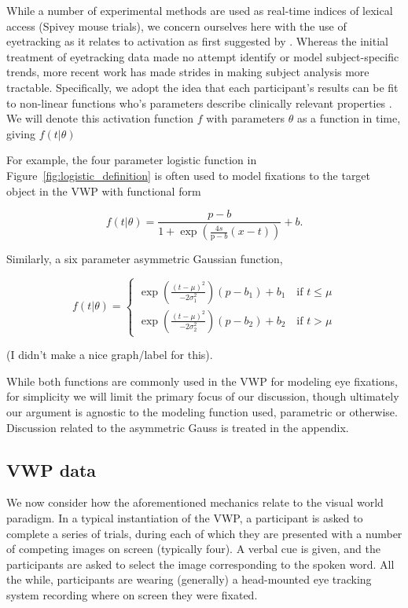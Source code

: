 While a number of experimental methods are used as real-time indices of lexical access (Spivey mouse trials), we concern ourselves here with the use of eyetracking as it relates to activation as first suggested by \cite{allopenna1998tracking}. Whereas the initial treatment of eyetracking data made no attempt identify or model subject-specific trends, more recent work has made strides in making subject analysis more tractable. Specifically, we adopt the idea that each participant's results can be fit to non-linear functions who's parameters describe clinically relevant properties \cite{mcmurray2010individual}. We will denote this activation function $f$ with parameters $\theta$ as a function in time, giving $f(t|\theta)$

For example, the four parameter logistic function in Figure~\ref{fig:logistic_definition} is often used to model fixations to the target object in the VWP with functional form

\begin{equation} \label{eq:logistic}
f(t|\theta) = \frac{p-b}{1 + \exp \left(\frac{4s}{\text{p}-b} (x - t) \right)} + b.
\end{equation}

Similarly, a six parameter asymmetric Gaussian function,

\begin{equation} \label{eq:dg}
f(t|\theta) = \begin{cases}
\exp \left( \frac{(t - \mu)^2}{-2\sigma_1^2} \right) (p - b_1) + b_1 \quad \text{if } t \leq \mu \\
\exp \left( \frac{(t - \mu)^2}{-2\sigma_2^2} \right) (p - b_2) + b_2 \quad \text{if } t > \mu
\end{cases}
\end{equation}

(I didn't make a nice graph/label for this). 

While both functions are commonly used in the VWP for modeling eye fixations, for simplicity we will limit the primary focus of our discussion, though ultimately our argument is agnostic to the modeling function used, parametric or otherwise. Discussion related to the asymmetric Gauss is treated in the appendix.


\subsection{VWP data}


We now consider how the aforementioned mechanics relate to the visual world paradigm. In a typical instantiation of the VWP, a participant is asked to complete a series of trials, during each of which they are presented with a number of competing images on screen (typically four). A verbal cue is given, and the participants are asked to select the image corresponding to the spoken word. All the while, participants are wearing (generally) a head-mounted eye tracking system recording where on screen they were fixated. 

